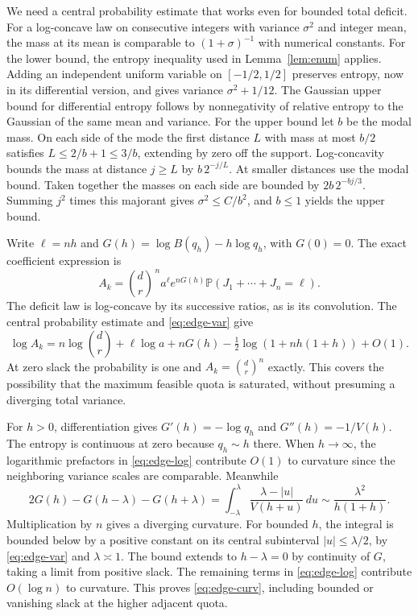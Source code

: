 \documentclass[11pt]{article}
\newcommand{\Prob}{\mathbb P}
\begin{document}
We need a central probability estimate that works even for bounded
total deficit. For a log-concave law on consecutive integers with
variance $\sigma^2$ and integer mean, the mass at its mean is
comparable to $(1+\sigma)^{-1}$ with numerical constants. For the
lower bound, the entropy inequality used in Lemma~\ref{lem:enum}
applies. Adding an independent uniform variable on $[-1/2,1/2]$
preserves entropy, now in its differential version, and gives variance
$\sigma^2+1/12$. The Gaussian upper bound for differential entropy
follows by nonnegativity of relative entropy to the Gaussian of the
same mean and variance. For the upper bound let $b$ be the modal
mass. On each side of the mode the first distance $L$ with mass at
most $b/2$ satisfies $L\le 2/b+1\le3/b$, extending by zero off the
support. Log-concavity bounds the mass at distance $j\ge L$ by
$b\,2^{-j/L}$. At smaller distances use the modal bound. Taken
together the masses on each side are bounded by
$2b\, 2^{-bj/3}$. Summing $j^2$ times this majorant gives
$\sigma^2\le C/b^2$, and $b\le1$ yields the upper bound.

Write $\ell=nh$ and $G(h)=\log B(q_h)-h\log q_h$, with $G(0)=0$.
The exact coefficient expression is
\[
A_k=\binom dr^{\,n}a^\ell e^{nG(h)}
       \Prob(J_1+\cdots+J_n=\ell).
\]
The deficit law is log-concave by its successive ratios, as is its
convolution. The central probability estimate and \eqref{eq:edge-var}
give
\begin{equation}\label{eq:edge-log}
\log A_k=n\log\binom dr+\ell\log a+nG(h)
   -\tfrac12\log(1+n h(1+h))+O(1).
\end{equation}
At zero slack the probability is one and $A_k=\binom dr^n$
exactly. This covers the possibility that the maximum feasible quota
is saturated, without presuming a diverging total variance.

For $h>0$, differentiation gives $G'(h)=-\log q_h$ and
$G''(h)=-1/V(h)$. The entropy is continuous at zero because
$q_h\sim h$ there. When $h\to\infty$, the logarithmic prefactors in
\eqref{eq:edge-log} contribute $O(1)$ to curvature since the
neighboring variance scales are comparable. Meanwhile
\[
2G(h)-G(h-\lambda)-G(h+\lambda)
  =\int_{-\lambda}^{\lambda}\frac{\lambda-|u|}{V(h+u)}\,du
  \sim \frac{\lambda^2}{h(1+h)}.
\]
Multiplication by $n$ gives a diverging curvature. For bounded $h$,
the integral is bounded below by a positive constant on its central
subinterval $|u|\le\lambda/2$, by \eqref{eq:edge-var} and
$\lambda\asymp1$. The bound extends to $h-\lambda=0$ by continuity
of $G$, taking a limit from positive slack. The remaining terms in
\eqref{eq:edge-log} contribute $O(\log n)$ to curvature. This proves
\eqref{eq:edge-curv}, including bounded or vanishing slack at the
higher adjacent quota.
\end{document}
